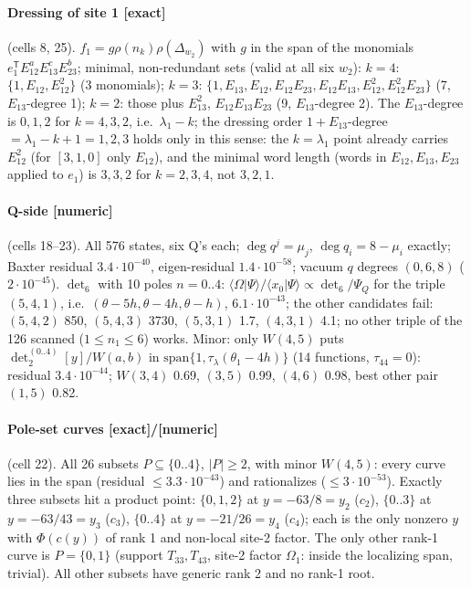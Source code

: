 \documentclass[11pt]{article}
\newcommand{\Om}{\Omega}
\newcommand{\eT}{e_1^{\mathsf T}}
\newcommand{\Tt}[1]{T_{#1}}
\newcommand{\ex}{\textbf{[exact]}}
\newcommand{\nm}{\textbf{[numeric]}}
\begin{document}
\paragraph{Dressing of site 1 \ex} (cells 8, 25). $f_1=g\rho(n_k)\rho(\Delta_{w_2})$ with $g$ in the span of the monomials $\eT E_{12}^aE_{13}^cE_{23}^b$; minimal, non-redundant sets (valid at all six $w_2$): $k=4$: $\{1,E_{12},E_{12}^2\}$ (3 monomials); $k=3$: $\{1,E_{13},E_{12},E_{12}E_{23},E_{12}E_{13},E_{12}^2,E_{12}^2E_{23}\}$ (7, $E_{13}$-degree 1); $k=2$: those plus $E_{13}^2$, $E_{12}E_{13}E_{23}$ (9, $E_{13}$-degree 2). The $E_{13}$-degree is $0,1,2$ for $k=4,3,2$, i.e.\ $\lambda_1-k$; the dressing order $1+E_{13}$-degree $=\lambda_1-k+1=1,2,3$ holds only in this sense: the $k=\lambda_1$ point already carries $E_{12}^2$ (for $[3,1,0]$ only $E_{12}$), and the minimal word length (words in $E_{12},E_{13},E_{23}$ applied to $e_1$) is $3,3,2$ for $k=2,3,4$, not $3,2,1$.

\paragraph{Q-side \nm} (cells 18--23). All 576 states, six Q's each; $\deg q^j=\mu_j$, $\deg q_i=8-\mu_i$ exactly; Baxter residual $3.4\cdot10^{-40}$, eigen-residual $1.4\cdot10^{-58}$; vacuum $q$ degrees $(0,6,8)$ ($2\cdot10^{-45}$). $\det_6$ with 10 poles $n=0..4$: $\langle\Om|\Psi\rangle/\langle x_0|\Psi\rangle\propto\det_6/\Psi_Q$ for the triple $(5,4,1)$, i.e.\ $(\theta-5h,\theta-4h,\theta-h)$, $6.1\cdot10^{-43}$; the other candidates fail: $(5,4,2)$ 850, $(5,4,3)$ 3730, $(5,3,1)$ 1.7, $(4,3,1)$ 4.1; no other triple of the 126 scanned ($1\le n_1\le6$) works. Minor: only $W(4,5)$ puts $\det_2^{(0..4)}[y]/W(a,b)$ in $\mathrm{span}\{1,\tau_\lambda(\theta_1-4h)\}$ (14 functions, $\tau_{44}=0$): residual $3.4\cdot10^{-44}$; $W(3,4)$ 0.69, $(3,5)$ 0.99, $(4,6)$ 0.98, best other pair $(1,5)$ 0.82.

\paragraph{Pole-set curves \ex/\nm} (cell 22). All 26 subsets $P\subseteq\{0..4\}$, $|P|\ge2$, with minor $W(4,5)$: every curve lies in the span (residual $\le3.3\cdot10^{-43}$) and rationalizes ($\le3\cdot10^{-53}$). Exactly three subsets hit a product point: $\{0,1,2\}$ at $y=-63/8=y_2$ ($c_2$), $\{0..3\}$ at $y=-63/43=y_3$ ($c_3$), $\{0..4\}$ at $y=-21/26=y_4$ ($c_4$); each is the only nonzero $y$ with $\Phi(c(y))$ of rank 1 and non-local site-2 factor. The only other rank-1 curve is $P=\{0,1\}$ (support $\Tt{33},\Tt{43}$, site-2 factor $\Om_1$: inside the localizing span, trivial). All other subsets have generic rank 2 and no rank-1 root.
\end{document}
